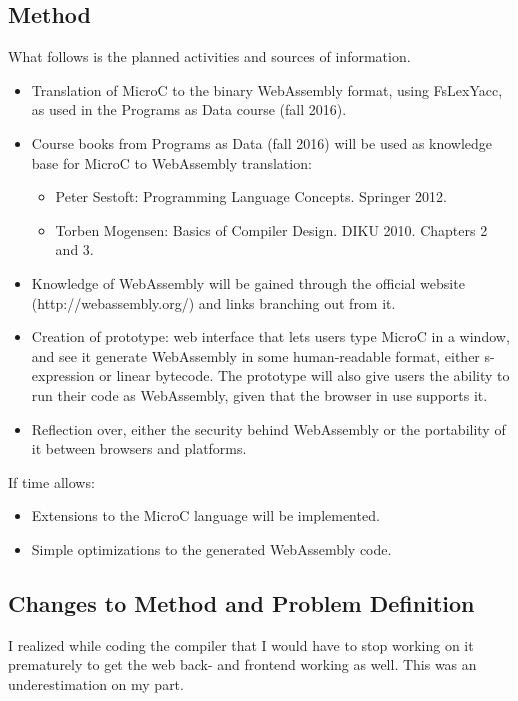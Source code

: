 \documentclass[a4paper]{article}
\makeatletter
\newcommand\footnoteref[1]{\protected@xdef\@thefnmark{\ref{#1}}\@footnotemark}
\makeatother
\begin{document}
\subsection{Method}
\label{sec:problem-definition:method}
What follows is the planned activities and sources of information.
\begin{itemize}
	\item Translation of MicroC to the binary WebAssembly format, using FsLexYacc\footnoteref{footnote:fslexyacc-url}, as used in the Programs as Data course (fall 2016).
	\item Course books from Programs as Data (fall 2016) will be used as knowledge base for MicroC to WebAssembly translation:
		\begin{itemize}
			\item Peter Sestoft: Programming Language Concepts. Springer 2012.
			\item Torben Mogensen: Basics of Compiler Design. DIKU 2010. Chapters 2 and 3.
		\end{itemize}
	\item Knowledge of WebAssembly will be gained through the official website (http://webassembly.org/) and links branching out from it.
	\item Creation of prototype: web interface that lets users type MicroC in a window, and see it generate WebAssembly in some human-readable format, either s-expression or linear bytecode. The prototype will also give users the ability to run their code as WebAssembly, given that the browser in use supports it.
	\item Reflection over, either the security behind WebAssembly or the portability of it between browsers and platforms.
\end{itemize}

\noindent If time allows:
\begin{itemize}
	\item Extensions to the MicroC language will be implemented.
	\item Simple optimizations to the generated WebAssembly code.
\end{itemize}
\pagebreak

\subsection{Changes to Method and Problem Definition}
\label{sec:problem-definition:changes}
I realized while coding the compiler that I would have to stop working on it prematurely to get the web back- and frontend working as well. This was an underestimation on my part.
\end{document}
